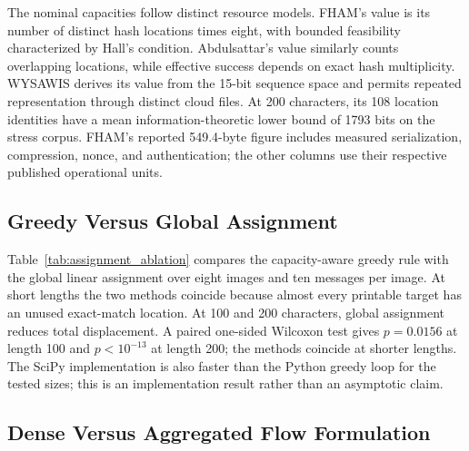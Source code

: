 \documentclass[preprint,12pt]{elsarticle}
\theoremstyle{plain}
\begin{document}
The nominal capacities follow distinct resource models. FHAM's value is its
number of distinct hash locations times eight, with bounded feasibility
characterized by Hall's condition. Abdulsattar's value similarly counts
overlapping locations, while effective success depends on exact hash
multiplicity. WYSAWIS derives its value from the 15-bit sequence space and
permits repeated representation through distinct cloud files. At 200
characters, its 108 location identities have a mean information-theoretic
lower bound of 1793 bits on the stress corpus. FHAM's reported 549.4-byte
figure includes measured serialization, compression, nonce, and
authentication; the other columns use their respective published operational
units.

\subsection{Greedy Versus Global Assignment}

Table~\ref{tab:assignment_ablation} compares the capacity-aware greedy rule
with the global linear assignment over eight images and ten messages per image.
At short lengths the two methods coincide because almost every printable target
has an unused exact-match location. At 100 and 200 characters, global
assignment reduces total displacement. A paired one-sided Wilcoxon test gives
$p=0.0156$ at length 100 and $p<10^{-13}$ at length 200; the methods coincide
at shorter lengths. The SciPy implementation is also faster
than the Python greedy loop for the tested sizes; this is an implementation
result rather than an asymptotic claim.

\begin{table}[!t]
\centering
\caption{Assignment Ablation: Mean Total Displacement and Assignment Time}
\label{tab:assignment_ablation}

\end{table}

\subsection{Dense Versus Aggregated Flow Formulation}
\end{document}
